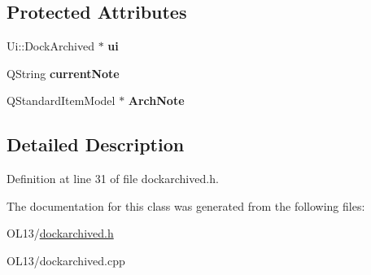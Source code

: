 \subsection*{Protected Attributes}
\begin{DoxyCompactItemize}
\item 
\mbox{\label{class_dock_a525f557d9a2670640105da2f1e605026}} 
Ui\+::\+Dock\+Archived $\ast$ {\bfseries ui}
\item 
\mbox{\label{class_dock_a6af86621e3df52266a582e464324e6d2}} 
Q\+String {\bfseries current\+Note}
\item 
\mbox{\label{class_dock_a484517393b214e1c3abe0c7b36596172}} 
Q\+Standard\+Item\+Model $\ast$ {\bfseries Arch\+Note}
\end{DoxyCompactItemize}


\subsection{Detailed Description}


Definition at line 31 of file dockarchived.\+h.



The documentation for this class was generated from the following files\+:\begin{DoxyCompactItemize}
\item 
O\+L13/\hyperlink{dockarchived_8h}{dockarchived.\+h}\item 
O\+L13/dockarchived.\+cpp\end{DoxyCompactItemize}
